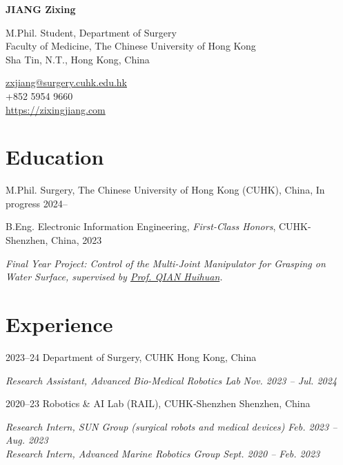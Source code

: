 \documentclass[11pt,letterpaper]{report}
\newcommand{\myname}{JIANG Zixing}
\newcommand{\namefont}[1]{{\normalfont\bfseries\Huge{#1}}}
\begin{document}
	\thispagestyle{firstpagefooter}
	\raggedright{}
	
\namefont{\myname}
	
\vspace{1em}
\begin{minipage}[t]{0.700\textwidth}
	M.Phil. Student, Department of Surgery\\
	Faculty of Medicine, The Chinese University of Hong Kong\\
	Sha Tin, N.T., Hong Kong, China
\end{minipage}
\hfil
\begin{minipage}[t]{0.295\textwidth}
	\flushright{}
	\href{mailto:zxjiang@surgery.cuhk.edu.hk}{zxjiang@surgery.cuhk.edu.hk} \\
	+852 5954 9660 \\
	\href{https://zixingjiang.com}{https://zixingjiang.com}\\
\end{minipage}
	
\section*{Education}
\begin{tablist}
	\item[M.Phil.]  \tab{}Surgery, The Chinese University of Hong Kong (CUHK), China, In progress 2024--\\
	\item[B.Eng.]  \tab{}Electronic Information Engineering, \textit{First-Class Honors}, CUHK-Shenzhen, China, 2023
	
	\textit{Final Year Project: Control of the Multi-Joint Manipulator for Grasping on Water Surface, supervised by \href{https://sse.cuhk.edu.cn/en/faculty/qianhuihuan}{Prof. QIAN Huihuan}.}
\end{tablist}
	

\section*{Experience}
\begin{tablist}	
	\item[2023--24]   \tab{}Department of Surgery, CUHK \hfill Hong Kong, China
	
	\textit{Research Assistant, Advanced Bio-Medical Robotics Lab} \hfill \textit{Nov. 2023 -- Jul. 2024}
		
	\item[2020--23]   \tab{}Robotics \& AI Lab (RAIL), CUHK-Shenzhen \hfill Shenzhen, China
	
	\textit{Research Intern, SUN Group (surgical robots and medical devices)} \hfill \textit{Feb. 2023 -- Aug. 2023}\\
	\textit{Research Intern, Advanced Marine Robotics Group} \hfill \textit{Sept. 2020 -- Feb. 2023}
\end{tablist}
	
\end{document}
